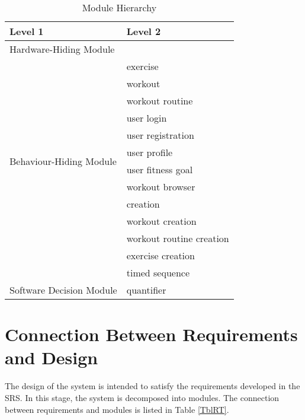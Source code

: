\documentclass[12pt, titlepage]{article}
\begin{document}
\begin{table}[h!]
\centering
\begin{tabular}{p{} p{}}
\toprule
\textbf{Level 1} & \textbf{Level 2}\\
\midrule

{Hardware-Hiding Module} & ~ \\
\midrule

\multirow{12}{0.3\textwidth}{Behaviour-Hiding Module}
& exercise\\
& workout\\
& workout routine\\
& user login\\
& user registration\\
& user profile\\ 
& user fitness goal\\
& workout browser\\
& creation\\
& workout creation\\
& workout routine creation\\
& exercise creation\\
& timed sequence\\
\midrule

\multirow{1}{0.3\textwidth}{Software Decision Module}
& quantifier\\
\bottomrule

\end{tabular}
\caption{Module Hierarchy}
\label{TblMH}
\end{table}

\section{Connection Between Requirements and Design} \label{SecConnection}

The design of the system is intended to satisfy the requirements developed in
the SRS. In this stage, the system is decomposed into modules. The connection
between requirements and modules is listed in Table \ref{TblRT}.

\end{document}
